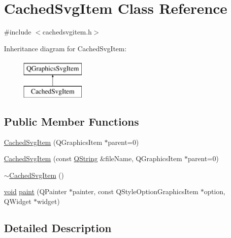 \hypertarget{class_cached_svg_item}{\section{Cached\-Svg\-Item Class Reference}
\label{class_cached_svg_item}
}


{\ttfamily \#include $<$cachedsvgitem.\-h$>$}

Inheritance diagram for Cached\-Svg\-Item\-:\begin{figure}[H]
\begin{center}
\leavevmode
\includegraphics[height=2.000000cm]{class_cached_svg_item}
\end{center}
\end{figure}
\subsection*{Public Member Functions}
{\bf }\par
\begin{DoxyCompactItemize}
\item 
\hyperlink{class_cached_svg_item_ae1c0b31841376ea3cec55a2b002d9fe5}{Cached\-Svg\-Item} (Q\-Graphics\-Item $\ast$parent=0)
\item 
\hyperlink{class_cached_svg_item_a8b1e0bc390daa3d770758f3d47dd8f9f}{Cached\-Svg\-Item} (const \hyperlink{group___u_a_v_objects_plugin_gab9d252f49c333c94a72f97ce3105a32d}{Q\-String} \&file\-Name, Q\-Graphics\-Item $\ast$parent=0)
\item 
\hyperlink{class_cached_svg_item_a6249258cff00607000243d23b75714f1}{$\sim$\-Cached\-Svg\-Item} ()
\item 
\hyperlink{group___u_a_v_objects_plugin_ga444cf2ff3f0ecbe028adce838d373f5c}{void} \hyperlink{class_cached_svg_item_a12c36e296ff3e196068d89f53e5d055a}{paint} (Q\-Painter $\ast$painter, const Q\-Style\-Option\-Graphics\-Item $\ast$option, Q\-Widget $\ast$widget)
\end{DoxyCompactItemize}



\subsection{Detailed Description}


